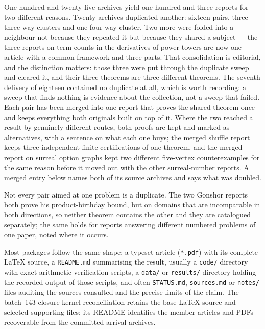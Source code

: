 \documentclass[11pt]{article}
\begin{document}
One hundred and twenty-five archives yield one hundred and three reports for
two different reasons.  Twenty archives duplicated another: sixteen pairs, three
three-way clusters and one four-way cluster.  Two more were folded into a
neighbour not because they repeated it but because they shared a subject --- the
three reports on term counts in the derivatives of power towers are now one
article with a common framework and three parts.  That consolidation is
editorial, and the distinction matters: those three were put through the
duplicate sweep and cleared it, and their three theorems are three different
theorems.  The seventh delivery of eighteen contained no duplicate at all, which
is worth recording: a sweep that finds nothing is evidence about the collection,
not a sweep that failed.
Each pair has been merged into one report that proves the
shared theorem once and keeps everything both originals built on top of it.
Where the two reached a result by genuinely different routes, both proofs are
kept and marked as alternatives, with a sentence on what each one buys; the
merged shuffle report keeps three independent finite certifications of one
theorem, and the merged report on surreal option graphs kept two different
five-vertex counterexamples for the same reason before it moved out with the
other surreal-number reports.  A merged entry below names both of its
source archives and says what was doubled.

Not every pair aimed at one problem is a duplicate.  The two Gonshor
reports both prove his product-birthday bound, but on domains that are
incomparable in both directions, so neither theorem contains the other and they
are catalogued separately; the same holds for reports answering different numbered problems of
one paper, noted where it occurs.

Most packages follow the same shape: a typeset article
(\texttt{*.pdf}) with its complete \LaTeX{} source, a \texttt{README.md}
summarising the result, usually a \texttt{code/} directory with exact-arithmetic
verification scripts, a \texttt{data/} or \texttt{results/} directory holding the
recorded output of those scripts, and often \texttt{STATUS.md},
\texttt{sources.md} or \texttt{notes/} files auditing the sources consulted and
the precise limits of the claim. The batch~143 closure-kernel reconciliation
retains the base \LaTeX{} source and selected supporting files; its README
identifies the member articles and PDFs recoverable from the committed
arrival archives.
\end{document}
